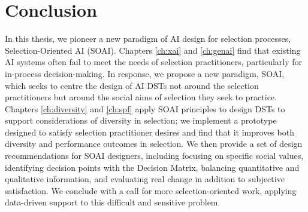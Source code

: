 \section{Conclusion}
In this thesis, we pioneer a new paradigm of AI design for selection processes, Selection-Oriented AI (SOAI). Chapters \ref{ch:xai} and \ref{ch:genai} find that existing AI systems often fail to meet the needs of selection practitioners, particularly for in-process decision-making. In response, we propose a new paradigm, SOAI, which seeks to centre the design of AI DSTs not around the selection practitioners but around the social aims of selection they seek to practice. Chapters \ref{ch:diversity} and \ref{ch:spf} apply SOAI principles to design DSTs to support considerations of diversity in selection; we implement a prototype designed to satisfy selection practitioner desires and find that it improves both diversity and performance outcomes in selection. We then provide a set of design recommendations for SOAI designers, including focusing on specific social values, identifying decision points with the Decision Matrix, balancing quantitative and qualitative information, and evaluating real change in addition to subjective satisfaction. We conclude with a call for more selection-oriented work, applying data-driven support to this difficult and sensitive problem.